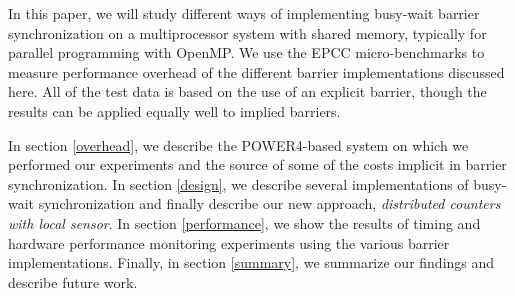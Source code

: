 In this paper, we will study different ways of implementing
busy-wait barrier synchronization on a multiprocessor system with
shared memory, typically for parallel programming with OpenMP. We use
the EPCC micro-benchmarks\cite{Edi99} to measure performance overhead of the different barrier
implementations discussed here. All of the test data is based on the use of an
explicit barrier, though the results can be applied equally well to implied barriers.


In section \ref{overhead}, we describe the POWER4-based system on which
we performed our experiments and the source of some of the costs implicit in
barrier synchronization.  In section \ref{design}, we describe several
implementations of busy-wait synchronization and finally describe our new approach, \emph{distributed counters with local sensor}.  In section \ref{performance}, we show the results of timing and hardware performance monitoring experiments using the various barrier implementations.  Finally, in section \ref{summary}, we summarize our findings and describe future work.


